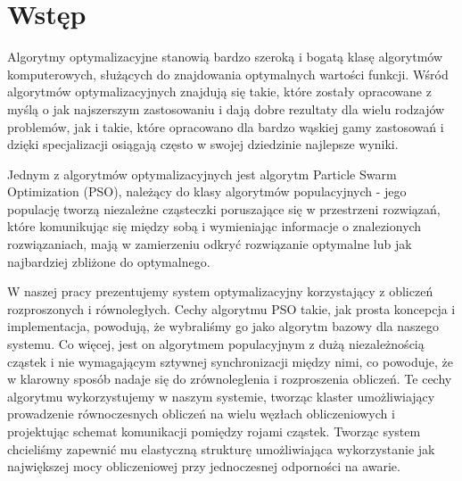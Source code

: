 \documentclass[12pt, twoside, openany, abstract=on]{report}
\theoremstyle{definition}
\begin{document}

\tableofcontents



\chapter{Wstęp}



Algorytmy optymalizacyjne stanowią bardzo szeroką i bogatą klasę algorytmów komputerowych, służących do znajdowania optymalnych wartości funkcji. Wśród algorytmów optymalizacyjnych znajdują się takie, które zostały opracowane z myślą o jak najszerszym zastosowaniu i dają dobre rezultaty dla wielu rodzajów problemów, jak i takie, które opracowano dla bardzo wąskiej gamy zastosowań i dzięki specjalizacji osiągają często w swojej dziedzinie najlepsze wyniki.

Jednym z algorytmów optymalizacyjnych jest algorytm Particle Swarm Optimization (PSO), należący do klasy algorytmów populacyjnych - jego populację tworzą niezależne cząsteczki poruszające się w przestrzeni rozwiązań, które komunikując się między sobą i wymieniając informacje o znalezionych rozwiązaniach, mają w zamierzeniu odkryć rozwiązanie optymalne lub jak najbardziej zbliżone do optymalnego.

W naszej pracy prezentujemy system optymalizacyjny korzystający z obliczeń rozproszonych i równoległych. Cechy algorytmu PSO takie, jak prosta koncepcja i implementacja, powodują, że wybraliśmy go jako algorytm bazowy dla naszego systemu. Co więcej, jest on algorytmem populacyjnym z dużą niezależnością cząstek i nie wymagającym sztywnej synchronizacji między nimi, co powoduje, że w klarowny sposób nadaje się do zrównoleglenia i rozproszenia obliczeń. Te cechy algorytmu wykorzystujemy w naszym systemie, tworząc klaster umożliwiający prowadzenie równoczesnych obliczeń na wielu węzłach obliczeniowych i projektując schemat komunikacji pomiędzy rojami cząstek. 
	Tworząc system chcieliśmy zapewnić mu elastyczną strukturę umożliwiająca wykorzystanie jak największej mocy obliczeniowej przy jednoczesnej odporności na awarie.
\end{document}
